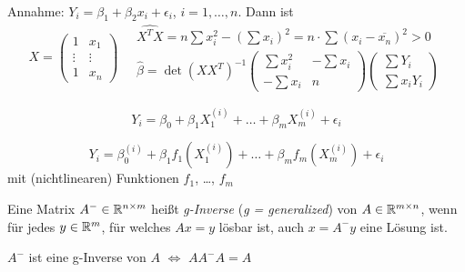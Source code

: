 \documentclass{cheat-sheet}
\begin{document}
\begin{bsp} \mbox{} \\
  Annahme: \enspace
  $Y_i = \beta_1 + \beta_2 x_i + \epsilon_i$, \enspace
  $i = 1, \ldots, n$.
  Dann ist
  \[
    X = \begin{pmatrix}
      1 & x_1 \\
      \vdots & \vdots \\
      1 & x_n
    \end{pmatrix} \quad
    \begin{array}{l}
      \hat{X^T X} = n \sum x_i^2 - \left( \sum x_i \right)^2 = n \cdot \sum (x_i - \overline{x_n})^2 > 0 \\[4pt]
      \hat{\beta} = \det(X X^T)^{-1} \begin{pmatrix}
        \sum x_i^2 & - \sum x_i \\
        - \sum x_i & n
      \end{pmatrix} \begin{pmatrix}
        \sum Y_i \\
        \sum x_i Y_i
      \end{pmatrix}
    \end{array}
  \]
\end{bsp}



\begin{bsp}
  \[ Y_i = \beta_0 + \beta_1 X_1^{(i)} + \ldots + \beta_m X_m^{(i)} + \epsilon_i \]
\end{bsp}


\begin{bsp}
  \[ Y_i = \beta_0^{(i)} + \beta_1 f_1(X_1^{(i)}) + \ldots + \beta_m f_m(X_m^{(i)}) + \epsilon_i \]
  mit (nichtlinearen) Funktionen $f_1$, \ldots, $f_m$
\end{bsp}


\begin{defn}
  Eine Matrix $A^{-} \in \mathbb{R}^{n \times m}$ heißt \emph{g-Inverse} (\textit{g = generalized}) von $A \in \mathbb{R}^{m \times n}$, wenn für jedes $y \in \mathbb{R}^m$, für welches $Ax = y$ lösbar ist, auch $x = A^{-} y$ eine Lösung ist.
\end{defn}

\begin{satz}
  $A^{-}$ ist eine g-Inverse von $A$ $\iff$ $A A^{-} A = A$
\end{satz}
\end{document}
